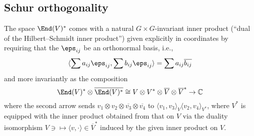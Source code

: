 \documentclass[reqno]{amsart} 
\begin{document}
\subsection{Schur orthogonality}\label{sec:schur-orthogonality}

\begin{definition}
  The space $\End(V)^*$ comes with a natural $G \times G$-invariant inner product (``dual of the Hilbert--Schmidt inner product'') given explicitly in coordinates by requiring that the $\eps_{i j}$ be an orthonormal basis, i.e.,
  \begin{equation}\label{eq:}
    \langle
    \sum a_{i j} \eps_{i j},
    \sum b_{i j} \eps_{i j}
    \rangle
    = \sum a_{i j} \overline{b_{i j}}
  \end{equation}
  and more invariantly as the composition
  \begin{equation}
    \End(V)^* \otimes \overline{\End(V)^*}
    \cong V \otimes V^* \otimes \overline{V} \otimes
    \overline{V}^*
    \rightarrow \mathbb{C} 
  \end{equation}
  where the second arrow sends $v_1 \otimes v_2 \otimes \overline{v_3} \otimes \overline{v_4}$ to $\langle v_1, v_3 \rangle_V \langle v_2, v_4 \rangle_{V^*}$, where $V^*$ is equipped with the inner product obtained from that on $V$ via the duality isomorphism $V \ni \mapsto \langle v, \cdot \rangle \in \overline{V}^*$ induced by the given inner product on $V$.
\end{definition}
\end{document}
